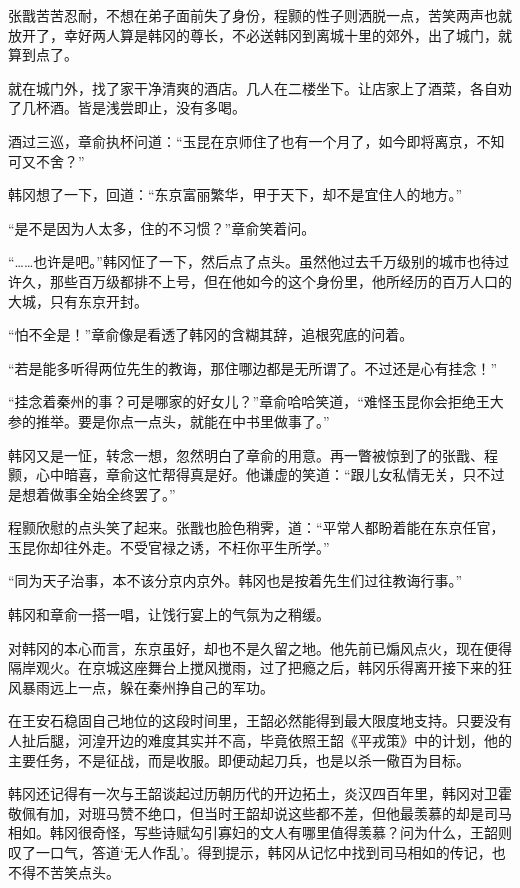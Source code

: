 张戬苦苦忍耐，不想在弟子面前失了身份，程颢的性子则洒脱一点，苦笑两声也就放开了，幸好两人算是韩冈的尊长，不必送韩冈到离城十里的郊外，出了城门，就算到点了。

就在城门外，找了家干净清爽的酒店。几人在二楼坐下。让店家上了酒菜，各自劝了几杯酒。皆是浅尝即止，没有多喝。

酒过三巡，章俞执杯问道：“玉昆在京师住了也有一个月了，如今即将离京，不知可又不舍？”

韩冈想了一下，回道：“东京富丽繁华，甲于天下，却不是宜住人的地方。”

“是不是因为人太多，住的不习惯？”章俞笑着问。

“……也许是吧。”韩冈怔了一下，然后点了点头。虽然他过去千万级别的城市也待过许久，那些百万级都排不上号，但在他如今的这个身份里，他所经历的百万人口的大城，只有东京开封。

“怕不全是！”章俞像是看透了韩冈的含糊其辞，追根究底的问着。

“若是能多听得两位先生的教诲，那住哪边都是无所谓了。不过还是心有挂念！”

“挂念着秦州的事？可是哪家的好女儿？”章俞哈哈笑道，“难怪玉昆你会拒绝王大参的推举。要是你点一点头，就能在中书里做事了。”

韩冈又是一怔，转念一想，忽然明白了章俞的用意。再一瞥被惊到了的张戬、程颢，心中暗喜，章俞这忙帮得真是好。他谦虚的笑道：“跟儿女私情无关，只不过是想着做事全始全终罢了。”

程颢欣慰的点头笑了起来。张戬也脸色稍霁，道：“平常人都盼着能在东京任官，玉昆你却往外走。不受官禄之诱，不枉你平生所学。”

“同为天子治事，本不该分京内京外。韩冈也是按着先生们过往教诲行事。”

韩冈和章俞一搭一唱，让饯行宴上的气氛为之稍缓。

对韩冈的本心而言，东京虽好，却也不是久留之地。他先前已煽风点火，现在便得隔岸观火。在京城这座舞台上搅风搅雨，过了把瘾之后，韩冈乐得离开接下来的狂风暴雨远上一点，躲在秦州挣自己的军功。

在王安石稳固自己地位的这段时间里，王韶必然能得到最大限度地支持。只要没有人扯后腿，河湟开边的难度其实并不高，毕竟依照王韶《平戎策》中的计划，他的主要任务，不是征战，而是收服。即便动起刀兵，也是以杀一儆百为目标。

韩冈还记得有一次与王韶谈起过历朝历代的开边拓土，炎汉四百年里，韩冈对卫霍敬佩有加，对班马赞不绝口，但当时王韶却说这些都不差，但他最羡慕的却是司马相如。韩冈很奇怪，写些诗赋勾引寡妇的文人有哪里值得羡慕？问为什么，王韶则叹了一口气，答道‘无人作乱’。得到提示，韩冈从记忆中找到司马相如的传记，也不得不苦笑点头。

